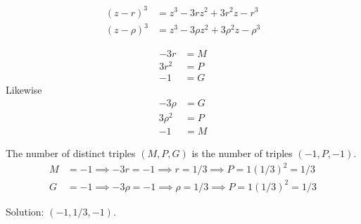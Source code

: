 \begin{align*}
(z-r)^{3} & = z^{3} - 3rz^{2} + 3r^{2}z - r^{3}
\\
(z-\rho)^{3} & = z^{3} - 3\rho z^{2} + 3\rho^{2}z - \rho^{3}
\end{align*}

\begin{align*}
-3r 
& = M
\\
3r^{2} 
& = P
\\
-1 
& = G
\end{align*}
Likewise
\begin{align*}
-3\rho 
& = G
\\
3\rho^{2} 
& = P
\\
-1 
& = M
\end{align*}

The number of distinct triples $(M,P,G)$ is the number of triples $(-1,P,-1)$. 
\begin{align*}
M & = -1 \implies -3r = -1 \implies r = 1/3 \implies P = 1(1/3)^{2} = 1/3
\\
G & = -1 \implies -3\rho = -1 \implies \rho = 1/3 \implies P = 1(1/3)^{2} = 1/3
\end{align*}

Solution: $(-1,1/3,-1)$. 
